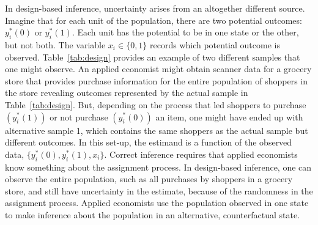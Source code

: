 \documentclass[11pt]{article}
\begin{document}
In design-based inference, uncertainty arises from an altogether different source. Imagine that for each unit of the population, there are two potential outcomes: $y_i^* (0)$ or $y_i^* (1)$. Each unit has the potential to be in one state or the other, but not both. The variable $x_i \in \{ 0,1 \}$ records which potential outcome is observed. Table~\ref{tab:design} provides an example of two different samples that one might observe. An applied economist might obtain scanner data for a grocery store that provides purchase information for the entire population of shoppers in the store revealing outcomes represented by the actual sample in Table~\ref{tab:design}. But, depending on the process that led shoppers to purchase $\left( y_i^* (1) \right)$ or not purchase $\left( y_i^* (0) \right)$ an item, one might have ended up with alternative sample 1, which contains the same shoppers as the actual sample but different outcomes. In this set-up, the estimand is a function of the observed data, $\{y_i^* (0), y_i^* (1), x_i \}$. Correct inference requires that applied economists know something about the assignment process. In design-based inference, one can observe the entire population, such as all purchases by shoppers in a grocery store, and still have uncertainty in the estimate, because of the randomness in the assignment process. Applied economists use the population observed in one state to make inference about the population in an alternative, counterfactual state.
\end{document}
